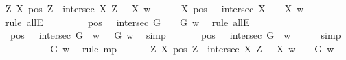 \begin{isabellebody}
\ {\isachardoublequoteopen}{\isacharparenleft}\isactrlbold {\isasymforall}Z\ X{\isachardot}\ {\isacharparenleft}pos\ Z\ \isactrlbold {\isasymand}\ intersec\ X\ Z{\isacharparenright}\ \isactrlbold {\isasymrightarrow}\ {\isasymP}\ X{\isacharparenright}\ w{\isachardoublequoteclose}\isanewline
\ \ \ \ \isamarkupfalse%
\ {\isachardoublequoteopen}{\isacharparenleft}\isactrlbold {\isasymforall}X{\isachardot}\ {\isacharparenleft}{\isacharparenleft}pos\ {\isasymP}{\isacharparenright}\ \isactrlbold {\isasymand}\ {\isacharparenleft}intersec\ X\ {\isasymP}{\isacharparenright}{\isacharparenright}\ \isactrlbold {\isasymrightarrow}\ {\isasymP}\ X{\isacharparenright}\ w{\isachardoublequoteclose}\ \ \isamarkupfalse%
\ {\isacharparenleft}rule\ allE{\isacharparenright}\ \ \ \isanewline
\ \ \ \ \isamarkupfalse%
\ {\isachardoublequoteopen}{\isacharparenleft}{\isacharparenleft}{\isacharparenleft}pos\ {\isasymP}{\isacharparenright}\ \isactrlbold {\isasymand}\ {\isacharparenleft}intersec\ G\ {\isasymP}{\isacharparenright}{\isacharparenright}\ \isactrlbold {\isasymrightarrow}\ {\isasymP}\ G{\isacharparenright}\ w{\isachardoublequoteclose}\ \isamarkupfalse%
\ {\isacharparenleft}rule\ allE{\isacharparenright}\isanewline
\ \ \ \ \isamarkupfalse%
\ {}{\isacharcolon}\ {\isachardoublequoteopen}{\isacharparenleft}{\isacharparenleft}pos\ {\isasymP}\ \isactrlbold {\isasymand}\ intersec\ G\ {\isasymP}{\isacharparenright}\ w{\isacharparenright}\ {\isasymlongrightarrow}\ {\isasymP}\ G\ w{\isachardoublequoteclose}\ \isamarkupfalse%
\ simp\isanewline
\ \ \ \ \isamarkupfalse%
\ {}{\isacharcolon}\ {\isachardoublequoteopen}{\isacharparenleft}{\isacharparenleft}pos\ {\isasymP}{\isacharparenright}\ \isactrlbold {\isasymand}\ {\isacharparenleft}intersec\ G\ {\isasymP}{\isacharparenright}{\isacharparenright}\ w{\isachardoublequoteclose}\ \isamarkupfalse%
\ {}\ {}\ \isamarkupfalse%
\ simp\isanewline
\ \ \ \ \isamarkupfalse%
\ {}\ {}\ \isamarkupfalse%
\ {\isachardoublequoteopen}{\isasymP}\ G\ w{\isachardoublequoteclose}\ \isamarkupfalse%
\ {\isacharparenleft}rule\ mp{\isacharparenright}\isanewline
\ \ \isacommand{{\isacharbraceright}}\isamarkupfalse%
\isanewline
\ \ \isamarkupfalse%
\ {\isachardoublequoteopen}{\isacharparenleft}\isactrlbold {\isasymforall}Z\ X{\isachardot}\ {\isacharparenleft}pos\ Z\ \isactrlbold {\isasymand}\ intersec\ X\ Z{\isacharparenright}\ \isactrlbold {\isasymrightarrow}\ {\isasymP}\ X{\isacharparenright}\ w\ \ {\isasymlongrightarrow}\ {\isasymP}\ G\ w{\isachardoublequoteclose}\ \isamarkupfalse%

\end{isabellebody}
